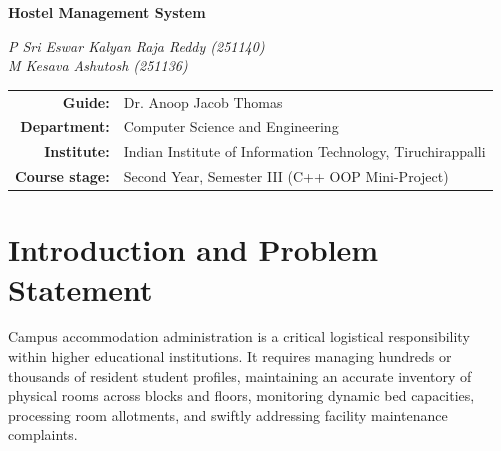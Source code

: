 \documentclass[12pt,a4paper]{article}
\begin{document}
\noindent
{\Huge \textbf{Hostel Management System}}

\vspace{0.35cm}
\begin{flushright}
\textit{P Sri Eswar Kalyan Raja Reddy (251140)}\\
\textit{M Kesava Ashutosh (251136)}
\end{flushright}

\vspace{0.8cm}

\begin{center}
\begin{tabular}{r@{\quad}l}
\textbf{Guide:} & Dr. Anoop Jacob Thomas \\
\textbf{Department:} & Computer Science and Engineering \\
\textbf{Institute:} & Indian Institute of Information Technology, Tiruchirappalli \\
\textbf{Course stage:} & Second Year, Semester III (C++ OOP Mini-Project)
\end{tabular}
\end{center}

\vspace{1.0cm}

\section{Introduction and Problem Statement}
\label{sec:intro}
Campus accommodation administration is a critical logistical responsibility within higher educational institutions. It requires managing hundreds or thousands of resident student profiles, maintaining an accurate inventory of physical rooms across blocks and floors, monitoring dynamic bed capacities, processing room allotments, and swiftly addressing facility maintenance complaints.
\end{document}
